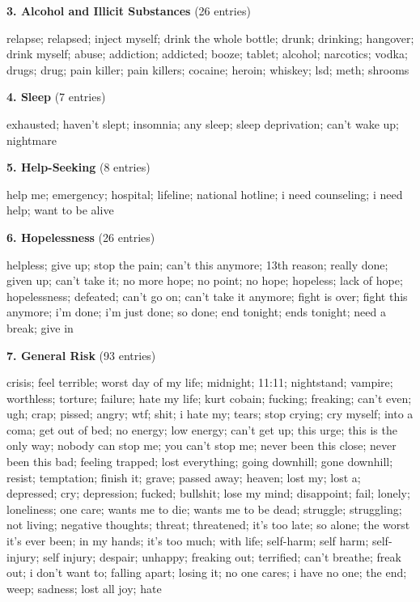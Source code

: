 \documentclass[review,12pt,authoryear]{elsarticle}
\begin{document}
\bigskip

\noindent\normalsize\textbf{3. Alcohol and Illicit Substances} (26 entries)

\noindent\small relapse; relapsed; inject myself; drink the whole bottle; drunk; drinking; hangover; drink myself; abuse; addiction; addicted; booze; tablet; alcohol; narcotics; vodka; drugs; drug; pain killer; pain killers; cocaine; heroin; whiskey; lsd; meth; shrooms

\bigskip

\noindent\normalsize\textbf{4. Sleep} (7 entries)

\noindent\small exhausted; haven't slept; insomnia; any sleep; sleep deprivation; can't wake up; nightmare

\bigskip

\noindent\normalsize\textbf{5. Help-Seeking} (8 entries)

\noindent\small help me; emergency; hospital; lifeline; national hotline; i need counseling; i need help; want to be alive

\bigskip

\noindent\normalsize\textbf{6. Hopelessness} (26 entries)

\noindent\small helpless; give up; stop the pain; can't this anymore; 13th reason; really done; given up; can't take it; no more hope; no point; no hope; hopeless; lack of hope; hopelessness; defeated; can't go on; can't take it anymore; fight is over; fight this anymore; i'm done; i'm just done; so done; end tonight; ends tonight; need a break; give in

\bigskip

\noindent\normalsize\textbf{7. General Risk} (93 entries)

\noindent\small crisis; feel terrible; worst day of my life; midnight; 11:11; nightstand; vampire; worthless; torture; failure; hate my life; kurt cobain; fucking; freaking; can't even; ugh; crap; pissed; angry; wtf; shit; i hate my; tears; stop crying; cry myself; into a coma; get out of bed; no energy; low energy; can't get up; this urge; this is the only way; nobody can stop me; you can't stop me; never been this close; never been this bad; feeling trapped; lost everything; going downhill; gone downhill; resist; temptation; finish it; grave; passed away; heaven; lost my; lost a; depressed; cry; depression; fucked; bullshit; lose my mind; disappoint; fail; lonely; loneliness; one care; wants me to die; wants me to be dead; struggle; struggling; not living; negative thoughts; threat; threatened; it's too late; so alone; the worst it's ever been; in my hands; it's too much; with life; self-harm; self harm; self-injury; self injury; despair; unhappy; freaking out; terrified; can't breathe; freak out; i don't want to; falling apart; losing it; no one cares; i have no one; the end; weep; sadness; lost all joy; hate
\end{document}

